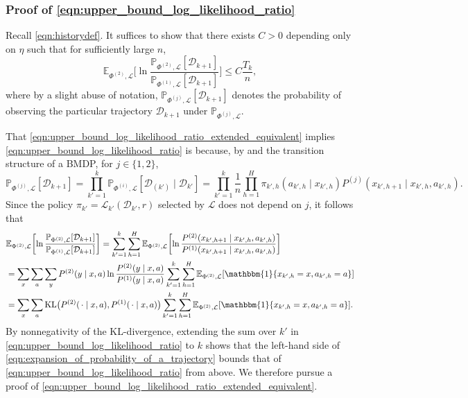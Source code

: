 \documentclass[11pt]{article}
\newcommand{\mcD}{\mathcal{D}}
\newcommand{\mcL}{\mathcal{L}}
\newcommand{\mbbP}{\mathbb{P}}
\newcommand{\mbbE}{\mathbb{E}}
\newcommand{\KL}{\textnormal{KL}}
\theoremstyle{definition}
\theoremstyle{definition}
\begin{document}
\subsubsection{Proof of \texorpdfstring{\eqref{eqn:upper_bound_log_likelihood_ratio}}{bound on loglikelihood ratio}}

Recall \eqref{eqn:historydef}.
It suffices to show that there exists $C>0$ depending only on $\eta$ such that for sufficiently large $n$,
\begin{equation}
	\label{eqn:upper_bound_log_likelihood_ratio_extended_equivalent}
	\mbbE_{\Phi^{(2)},\mcL}
	\biggl[\ln\frac{\mbbP_{\Phi^{(2)},\mcL}[\mcD_{k+1}]}{\mbbP_{\Phi^{(1)},\mcL}[\mcD_{k+1}]}\biggr]
	\leq
	C\frac{T_k}{n}
	,
\end{equation}
where by a slight abuse of notation, $\mbbP_{\Phi^{(j)},\mcL}[\mcD_{k+1}]$ denotes the probability of observing the particular trajectory $\mcD_{k+1}$ under $\mbbP_{\Phi^{(j)},\mcL}$.

That \eqref{eqn:upper_bound_log_likelihood_ratio_extended_equivalent} implies \eqref{eqn:upper_bound_log_likelihood_ratio} is because, by  and the transition structure of a \gls{BMDP}, for $j\in\{1,2\}$,
\begin{equation}
	\label{eqn:expansion_of_probability_of_a_trajectory}
	\mbbP_{\Phi^{(j)},\mcL}[\mcD_{k+1}]
	=
	\prod_{k'=1}^{k}
	\mbbP_{\Phi^{(i)},\mcL}[\mcD_{(k')}\mid \mcD_{k'}]
	=
	\prod_{k'=1}^{k}
	\frac{1}{n}
	\prod_{h=1}^H
	\pi_{k',h}(a_{k',h}\mid x_{k',h}) P^{(j)}(x_{k',h+1}\mid x_{k',h},a_{k',h})
	.
\end{equation}
Since the policy $\pi_{k'} = \mcL_{k'}(\mcD_{k'},r)$ selected by $\mcL$ does not depend on $j$, it follows that
\begin{align}
	 &
	\mbbE_{\Phi^{(2)},\mcL}
	\biggl[\ln\frac{\mbbP_{\Phi^{(2)},\mcL}[\mcD_{k+1}]}{\mbbP_{\Phi^{(1)},\mcL}[\mcD_{k+1}]}\biggr]
	=
	\sum_{k'=1}^k
	\sum_{h=1}^H
	\mbbE_{\Phi^{(2)},\mcL}\biggl[\ln\frac{P^{(2)}(x_{k',h+1}\mid x_{k',h},a_{k',h})}{P^{(1)}(x_{k',h+1}\mid x_{k',h},a_{k',h})}\biggr]
	\nonumber
	\\
	 &
	=
	\sum_x
	\sum_a
	\sum_y
	P^{(2)}(y\mid x,a)\ln\frac{P^{(2)}(y\mid x,a)}{P^{(1)}(y\mid x,a)}
	\sum_{k'=1}^k\sum_{h=1}^H\mbbE_{\Phi^{(2)},\mcL}[\mathbbm{1}\{x_{k',h}=x,a_{k',h}=a\}]
	\label{eqn:log_likelihood_expression}
	\\
	&
	=
	\sum_x
	\sum_a
	\KL\bigl(P^{(2)}(\,\cdot\mid x,a),P^{(1)}(\,\cdot\mid x,a)\bigr)\sum_{k'=1}^k\sum_{h=1}^H\mbbE_{\Phi^{(2)},\mcL}[\mathbbm{1}\{x_{k',h}=x,a_{k',h}=a\}]
	.
	\nonumber
\end{align}
By nonnegativity of the KL-divergence, extending the sum over $k'$ in \eqref{eqn:upper_bound_log_likelihood_ratio} to $k$ shows that the left-hand side of \eqref{eqn:expansion_of_probability_of_a_trajectory} bounds that of \eqref{eqn:upper_bound_log_likelihood_ratio} from above.
We therefore pursue a proof of \eqref{eqn:upper_bound_log_likelihood_ratio_extended_equivalent}.
\end{document}
